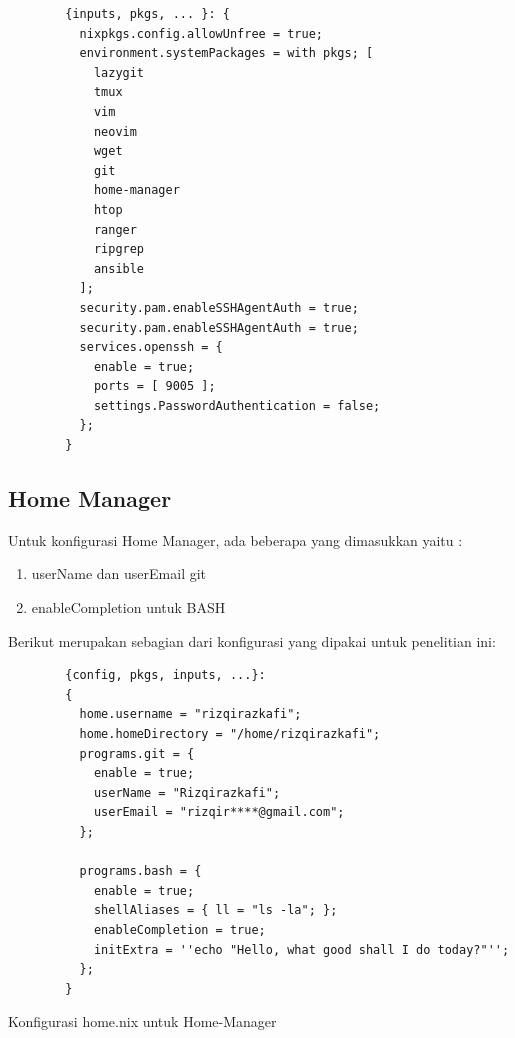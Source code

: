 \documentclass[10pt,]{report}
\newenvironment{code}{\captionsetup{type=listing}}{\vspace{3mm}}
\begin{document}
\begin{adjustwidth}{20pt}{}
\begin{adjustwidth}{20pt}{}
		\begin{code}
			\begin{verbatim}
        {inputs, pkgs, ... }: {
          nixpkgs.config.allowUnfree = true;
          environment.systemPackages = with pkgs; [
            lazygit
            tmux
            vim
            neovim
            wget
            git
            home-manager
            htop
            ranger
            ripgrep
            ansible
          ];
          security.pam.enableSSHAgentAuth = true;
          security.pam.enableSSHAgentAuth = true;
          services.openssh = {
            enable = true;
            ports = [ 9005 ];
            settings.PasswordAuthentication = false;
          };
        }
      \end{verbatim}
		\end{code}
	\end{adjustwidth}
	\subsection{Home Manager}
	\vspace{-3mm}
	\begin{adjustwidth}{20pt}{}
		Untuk konfigurasi Home Manager, ada beberapa yang dimasukkan yaitu :
		\begin{enumerate}
			\item userName dan userEmail git
			\item enableCompletion untuk BASH
		\end{enumerate}

		Berikut merupakan sebagian dari konfigurasi yang dipakai untuk penelitian ini:

		\begin{code}
			\begin{verbatim}
        {config, pkgs, inputs, ...}:
        {
          home.username = "rizqirazkafi";
          home.homeDirectory = "/home/rizqirazkafi";
          programs.git = {
            enable = true;
            userName = "Rizqirazkafi";
            userEmail = "rizqir****@gmail.com";
          };

          programs.bash = {
            enable = true;
            shellAliases = { ll = "ls -la"; };
            enableCompletion = true;
            initExtra = ''echo "Hello, what good shall I do today?"'';
          };
        }
      \end{verbatim}
			\caption{Konfigurasi home.nix untuk Home-Manager}
		\end{code}
	\end{adjustwidth}

\end{adjustwidth}
\end{document}
